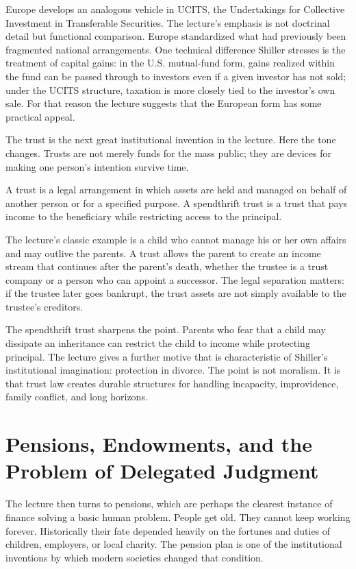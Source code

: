 Europe develops an analogous vehicle in UCITS, the Undertakings for Collective Investment in Transferable Securities. The lecture's emphasis is not doctrinal detail but functional comparison. Europe standardized what had previously been fragmented national arrangements. One technical difference Shiller stresses is the treatment of capital gains: in the U.S. mutual-fund form, gains realized within the fund can be passed through to investors even if a given investor has not sold; under the UCITS structure, taxation is more closely tied to the investor's own sale. For that reason the lecture suggests that the European form has some practical appeal.

The trust is the next great institutional invention in the lecture. Here the tone changes. Trusts are not merely funds for the mass public; they are devices for making one person's intention survive time.

\begin{definition}
A trust is a legal arrangement in which assets are held and managed on behalf of another person or for a specified purpose. A spendthrift trust is a trust that pays income to the beneficiary while restricting access to the principal.
\end{definition}

The lecture's classic example is a child who cannot manage his or her own affairs and may outlive the parents. A trust allows the parent to create an income stream that continues after the parent's death, whether the trustee is a trust company or a person who can appoint a successor. The legal separation matters: if the trustee later goes bankrupt, the trust assets are not simply available to the trustee's creditors.

The spendthrift trust sharpens the point. Parents who fear that a child may dissipate an inheritance can restrict the child to income while protecting principal. The lecture gives a further motive that is characteristic of Shiller's institutional imagination: protection in divorce. The point is not moralism. It is that trust law creates durable structures for handling incapacity, improvidence, family conflict, and long horizons.

\section{Pensions, Endowments, and the Problem of Delegated Judgment}

The lecture then turns to pensions, which are perhaps the clearest instance of finance solving a basic human problem. People get old. They cannot keep working forever. Historically their fate depended heavily on the fortunes and duties of children, employers, or local charity. The pension plan is one of the institutional inventions by which modern societies changed that condition.

